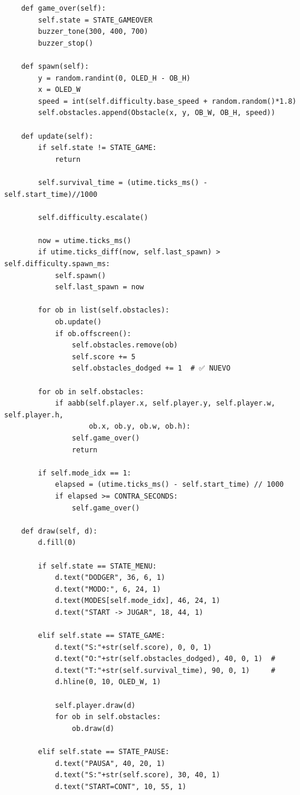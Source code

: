 \documentclass[12pt]{article}
\begin{document}
\begin{lstlisting}
    def game_over(self):
        self.state = STATE_GAMEOVER
        buzzer_tone(300, 400, 700)
        buzzer_stop()

    def spawn(self):
        y = random.randint(0, OLED_H - OB_H)
        x = OLED_W
        speed = int(self.difficulty.base_speed + random.random()*1.8)
        self.obstacles.append(Obstacle(x, y, OB_W, OB_H, speed))

    def update(self):
        if self.state != STATE_GAME:
            return

        self.survival_time = (utime.ticks_ms() - self.start_time)//1000

        self.difficulty.escalate()

        now = utime.ticks_ms()
        if utime.ticks_diff(now, self.last_spawn) > self.difficulty.spawn_ms:
            self.spawn()
            self.last_spawn = now

        for ob in list(self.obstacles):
            ob.update()
            if ob.offscreen():
                self.obstacles.remove(ob)
                self.score += 5
                self.obstacles_dodged += 1  # ✅ NUEVO

        for ob in self.obstacles:
            if aabb(self.player.x, self.player.y, self.player.w, self.player.h,
                    ob.x, ob.y, ob.w, ob.h):
                self.game_over()
                return

        if self.mode_idx == 1:
            elapsed = (utime.ticks_ms() - self.start_time) // 1000
            if elapsed >= CONTRA_SECONDS:
                self.game_over()

    def draw(self, d):
        d.fill(0)

        if self.state == STATE_MENU:
            d.text("DODGER", 36, 6, 1)
            d.text("MODO:", 6, 24, 1)
            d.text(MODES[self.mode_idx], 46, 24, 1)
            d.text("START -> JUGAR", 18, 44, 1)

        elif self.state == STATE_GAME:
            d.text("S:"+str(self.score), 0, 0, 1)
            d.text("O:"+str(self.obstacles_dodged), 40, 0, 1)  # 
            d.text("T:"+str(self.survival_time), 90, 0, 1)     # 
            d.hline(0, 10, OLED_W, 1)

            self.player.draw(d)
            for ob in self.obstacles:
                ob.draw(d)

        elif self.state == STATE_PAUSE:
            d.text("PAUSA", 40, 20, 1)
            d.text("S:"+str(self.score), 30, 40, 1)
            d.text("START=CONT", 10, 55, 1)


\end{lstlisting}
\end{document}
